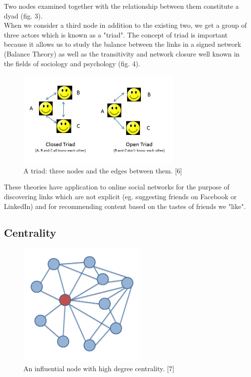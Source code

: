 \documentclass[conference,letterpaper]{IEEEtran}
\begin{document}
Two nodes examined together with the relationship between them constitute a dyad (fig. 3). \\
When we consider a third node in addition to the existing two, we get a group of three actors which is known as a "triad". The concept of triad is important because it allows us to study the balance between the links in a signed network (Balance Theory) as well as the transitivity and network closure well known in the fields of sociology and psychology (fig. 4).\\
\begin{center}
\begin{figure}[hb]
\centering
\includegraphics[width=3.2in]{open-triad}
\caption{
A triad: three nodes and the edges between them. [6]
}
\label{fig_sim}
\end{figure}
\end{center}
These theories have application to online social networks for the purpose of discovering links which are not explicit (eg. suggesting friends on Facebook or LinkedIn) and for recommending content based on the tastes of friends we "like".\\

\subsection{Centrality}

\begin{center}
\begin{figure}[hb]
\centering
\includegraphics[width=2.5in]{ego_network}
\caption{
An influential node with high degree centrality. [7]
}
\label{fig_sim}
\end{figure}
\end{center}
\end{document}
